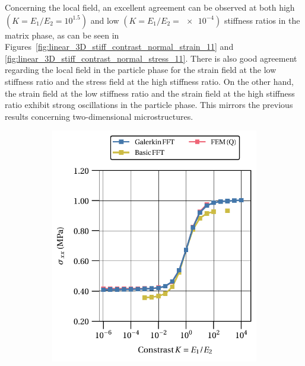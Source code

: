 Concerning the local field, an excellent agreement can be observed at both high \((K=E_1/E_2=10^{1.5})\) and low \((K=E_1/E_2=\num{e-4})\) stiffness ratios in the matrix phase, as can be seen in Figures~\ref{fig:linear_3D_stiff_contrast_normal_strain_11} and \ref{fig:linear_3D_stiff_contrast_normal_stress_11}.
There is also good agreement regarding the local field in the particle phase for the strain field at the low stiffness ratio and the stress field at the high stiffness ratio.
On the other hand, the strain field at the low stiffness ratio and the strain field at the high stiffness ratio exhibit strong oscillations in the particle phase.
This mirrors the previous results concerning two-dimensional microstructures.

\begin{figure}[hbt]
  \centering
  	\begin{subfigure}[b]{0.49\textwidth}
      \centering
      \includegraphics[width=\textwidth]{figures/linear_3D_normal_stress_avg_vs_stiff_ratio}
      \caption{}
      \label{subfig:linear_3D_normal_stress_avg_vs_stiff_ratio}
    \end{subfigure}
    \begin{subfigure}[b]{0.49\textwidth}

\end{subfigure}
\end{figure}
